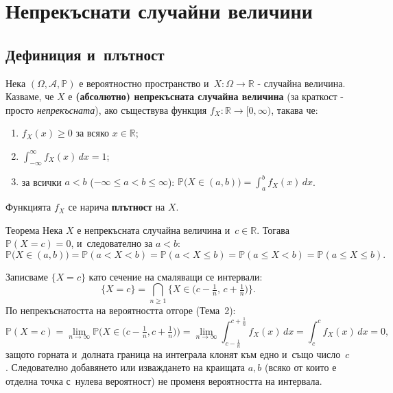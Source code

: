 \chapter{Непрекъснати случайни величини}

\section{Дефиниция и~плътност}

\begin{defbox}
Нека $(\Omega,\mathcal A,\mathbb P)$ е вероятностно пространство и~$X:\Omega\to\mathbb R$ - случайна величина. Казваме, че $X$ е
\textbf{(абсолютно) непрекъсната случайна величина} (за краткост -
просто \emph{непрекъсната}), ако съществува функция
$f_X:\mathbb R\to[0,\infty)$, такава че:
\begin{enumerate}[label=\arabic*)]
  \item $f_X(x)\ge0$ за всяко $x\in\mathbb R$;
  \item $\displaystyle\int_{-\infty}^{\infty} f_X(x)\,dx = 1$;
  \item за всички $a<b$ ($-\infty\le a<b\le\infty$): $\displaystyle
  \mathbb P\big(X\in(a,b)\big) = \int_a^b f_X(x)\,dx$.
\end{enumerate}
Функцията $f_X$ се нарича \textbf{плътност} на $X$.
\end{defbox}

\begin{thmbox}[]{Теорема}
Нека $X$ е непрекъсната случайна величина и~$c\in\mathbb R$. Тогава
$\mathbb P(X=c)=0$, и~следователно за $a<b$:
\[
  \mathbb P\big(X\in(a,b)\big) = \mathbb P(a<X<b) = \mathbb P(a<X\le b) = \mathbb P(a\le X<b) = \mathbb P(a\le X\le b).
\]
\end{thmbox}

\begin{proofbox}
Записваме $\{X=c\}$ като сечение на смаляващи се интервали:
\[
  \{X=c\} = \bigcap_{n\ge1} \Big\{X\in\big(c-\tfrac1n,\,c+\tfrac1n\big)\Big\}.
\]
По непрекъснатостта на вероятността отгоре (Тема~2):
\[
  \mathbb P(X=c) = \lim_{n\to\infty} \mathbb P\Big(X\in\big(c-\tfrac1n,c+\tfrac1n\big)\Big) = \lim_{n\to\infty}\int_{c-\frac1n}^{c+\frac1n} f_X(x)\,dx = \int_c^c f_X(x)\,dx = 0,
\]
защото горната и~долната граница на интеграла клонят към едно и~също число~$c$. Следователно добавянето или изваждането на краищата
$a,b$ (всяко от които е отделна точка с~нулева вероятност) не
променя вероятността на интервала. \qedbg
\end{proofbox}

